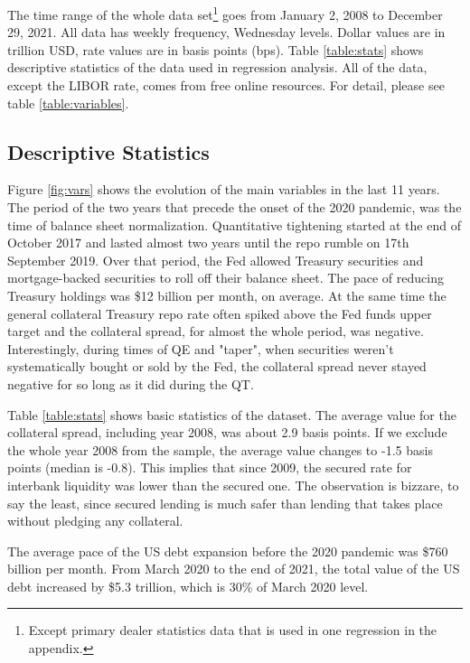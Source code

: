 \documentclass[11pt,a4paper,english,oneside]{article}
\begin{document}
The time range of the whole data set\footnote{Except primary dealer statistics data that is used in one regression in the appendix.} goes from January 2, 2008 to December 29, 2021. All data has weekly frequency, Wednesday levels. Dollar values are in trillion USD, rate values are in basis points (bps). Table \ref{table:stats} shows descriptive statistics of the data used in regression analysis. All of the data, except the LIBOR rate, comes from free online resources. For detail, please see table \ref{table:variables}.


\subsection{Descriptive Statistics} \label{sec:stats}

Figure \ref{fig:vars} shows the evolution of the main variables in the last 11 years. The period of the two years that precede the onset of the 2020 pandemic, was the time of balance sheet normalization. Quantitative tightening started at the end of October 2017 and lasted almost two years until the repo rumble on 17th September 2019. Over that period, the Fed allowed Treasury securities and mortgage-backed securities to roll off their balance sheet. The pace of reducing Treasury holdings was \$12 billion per month, on average. At the same time the general collateral Treasury repo rate often spiked above the Fed funds upper target and the collateral spread, for almost the whole period, was negative. Interestingly, during times of QE and "taper", when securities weren't systematically bought or sold by the Fed, the collateral spread never stayed negative for so long as it did during the QT.

Table \ref{table:stats} shows basic statistics of the dataset. The average value for the collateral spread, including year 2008, was about 2.9 basis points. If we exclude the whole year 2008 from the sample, the average value changes to -1.5 basis points (median is -0.8). This implies that since 2009, the secured rate for interbank liquidity was lower than the secured one. The observation is bizzare, to say the least, since secured lending is much safer than lending that takes place without pledging any collateral.

The average pace of the US debt expansion before the 2020 pandemic was \$760 billion per month. From March 2020 to the end of 2021, the total value of the US debt increased by \$5.3 trillion, which is 30\% of March 2020 level.
\end{document}
